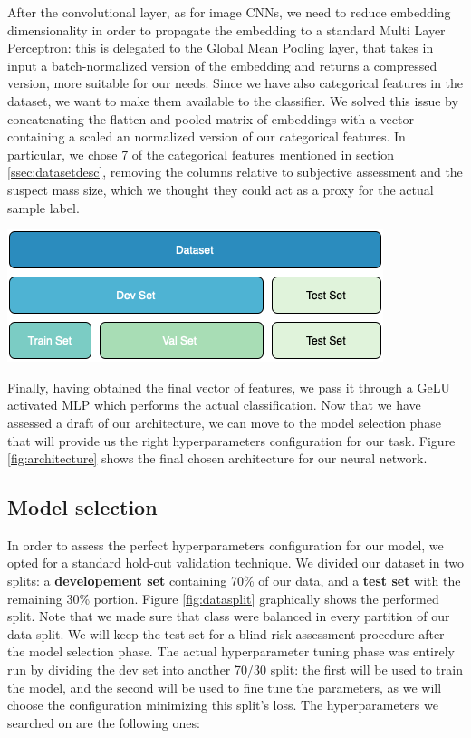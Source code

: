 \documentclass{article}
\newenvironment{Figure}
  {\par\medskip\noindent\minipage{\linewidth}}
  {\endminipage\par\medskip}
\begin{document}
\begin{multicols}{2}
After the convolutional layer, as for image CNNs, we need to reduce embedding dimensionality in order to propagate the embedding to a standard Multi Layer Perceptron: this is delegated to the Global Mean Pooling layer, that takes in input a batch-normalized version of the embedding and returns a compressed version, more suitable for our needs. 
Since we have also categorical features in the dataset, we want to make them available to the classifier. We solved this issue by concatenating the flatten and pooled matrix of embeddings with a vector containing a scaled an normalized version of our categorical features. In particular, we chose 7 of the categorical features mentioned in section \ref{ssec:datasetdesc}, removing the columns relative to subjective assessment and the suspect mass size, which we thought they could act as a proxy for the actual sample label.
\begin{Figure}
    \centering
    \includegraphics[width=0.9\linewidth]{assets/split-boarder.png} 
    \label{fig:datasplit}
\end{Figure}
Finally, having obtained the final vector of features, we pass it through a GeLU activated MLP which performs the actual classification. Now that we have assessed a draft of our architecture, we can move to the model selection phase that will provide us the right hyperparameters configuration for our task.
Figure \ref{fig:architecture} shows the final chosen architecture for our neural network.

\subsection{Model selection}
In order to assess the perfect hyperparameters configuration for our model, we opted for a standard hold-out validation technique.
We divided our dataset in two splits: a \textbf{developement set} containing 70\% of our data, and a \textbf{test set} with the remaining 30\% portion. Figure \ref{fig:datasplit} graphically shows the performed split. Note that we made sure that class were balanced in every partition of our data split.
\noindent
We will keep the test set for a blind risk assessment procedure after the model selection phase. The actual hyperparameter tuning phase was entirely run by dividing the dev set into another 70/30 split: the first will be used to train the model, and the second will be used to fine tune the parameters, as we will choose the configuration minimizing this split's loss. The hyperparameters we searched on are the following ones:


\end{multicols}
\end{document}
